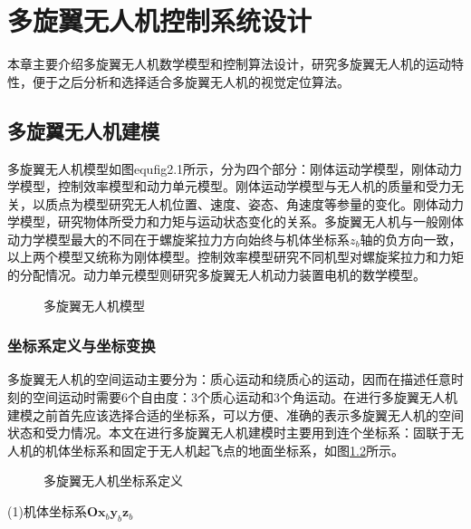 
\chapter{多旋翼无人机控制系统设计}
\label{chap:control design}
本章主要介绍多旋翼无人机数学模型和控制算法设计，研究多旋翼无人机的运动特性，便于之后分析和选择适合多旋翼无人机的视觉定位算法。

\section{多旋翼无人机建模}
多旋翼无人机模型如图equ{fig2.1}所示，分为四个部分：刚体运动学模型，刚体动力学模型，控制效率模型和动力单元模型。刚体运动学模型与无人机的质量和受力无关，以质点为模型研究无人机位置、速度、姿态、角速度等参量的变化。刚体动力学模型，研究物体所受力和力矩与运动状态变化的关系。多旋翼无人机与一般刚体动力学模型最大的不同在于螺旋桨拉力方向始终与机体坐标系$z_b$轴的负方向一致，以上两个模型又统称为刚体模型。控制效率模型研究不同机型对螺旋桨拉力和力矩的分配情况。动力单元模型则研究多旋翼无人机动力装置电机的数学模型。
\begin{figure}
\centering
\caption{多旋翼无人机模型}
\label{fig2.1}
\end{figure}

\subsection{坐标系定义与坐标变换}
多旋翼无人机的空间运动主要分为：质心运动和绕质心的运动，因而在描述任意时刻的空间运动时需要6个自由度：3个质心运动和3个角运动。在进行多旋翼无人机建模之前首先应该选择合适的坐标系，可以方便、准确的表示多旋翼无人机的空间状态和受力情况。本文在进行多旋翼无人机建模时主要用到连个坐标系：固联于无人机的机体坐标系和固定于无人机起飞点的地面坐标系，如图\ref{fig2.2}所示。\\
\begin{figure}
\centering
\caption{多旋翼无人机坐标系定义}
\label{fig2.2}
\end{figure}
(1)机体坐标系$\boldsymbol{O} \boldsymbol{x}_b \boldsymbol{y}_b \boldsymbol{z}_b$

